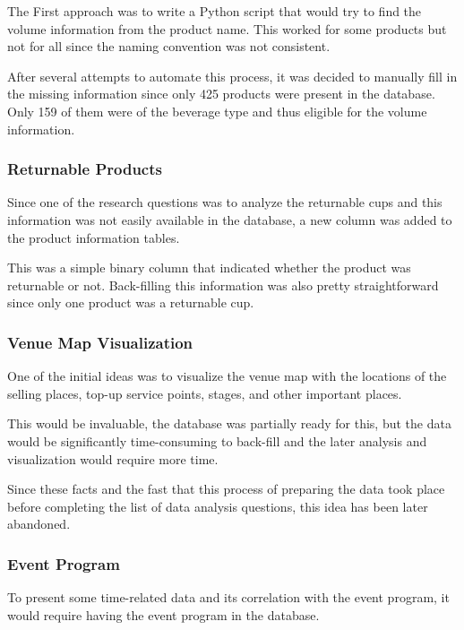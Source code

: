 The First approach was to write a Python script that would try to find the volume information from the product name.
This worked for some products but not for all since the naming convention was not consistent.

After several attempts to automate this process, it was decided to manually fill in the missing information since only 425 products were present in the database.
Only 159 of them were of the beverage type and thus eligible for the volume information.

\subsubsection{Returnable Products}
\label{subsubsec:data-methodology-local-database-modifications-returnable}
Since one of the research questions was to analyze the returnable cups and this information was not easily available in the database, a new column was added to the product information tables.

This was a simple binary column that indicated whether the product was returnable or not.
Back-filling this information was also pretty straightforward since only one product was a returnable cup.

\subsubsection{Venue Map Visualization}
\label{subsubsec:data-methodology-local-database-modifications-venue-map}
One of the initial ideas was to visualize the venue map with the locations of the selling places, top-up service points, stages, and other important places.

This would be invaluable, the database was partially ready for this, but the data would be significantly time-consuming to back-fill and the later analysis and visualization would require more time.

Since these facts and the fast that this process of preparing the data took place before completing the list of data analysis questions, this idea has been later abandoned.

\subsubsection{Event Program}
\label{subsubsec:data-methodology-local-database-modifications-program}
To present some time-related data and its correlation with the event program, it would require having the event program in the database.

